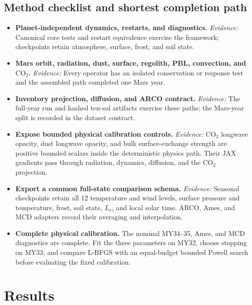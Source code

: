 \documentclass{article}
\newcommand{\done}{\(\boxtimes\)}
\newcommand{\todo}{\(\square\)}
\newcommand{\evidence}{\textit{Evidence:}}
\begin{document}
\subsection{Method checklist and shortest completion path}
\begin{itemize}[leftmargin=1.8em,itemsep=5pt]
\item[\done] \textbf{Planet-independent dynamics, restarts, and diagnostics.}
\evidence{} Canonical core tests and restart equivalence exercise the framework;
checkpoints retain atmosphere, surface, frost, and soil state.

\item[\done] \textbf{Mars orbit, radiation, dust, surface, regolith, PBL,
convection, and \(\mathrm{CO_2}\).} \evidence{} Every operator has an isolated
conservation or response test and the assembled path completed one Mars year.

\item[\done] \textbf{Inventory projection, diffusion, and ARCO contract.}
\evidence{} The full-year run and hashed ten-sol artifacts exercise these paths;
the Mars-year split is recorded in the dataset contract.

\item[\done] \textbf{Expose bounded physical calibration controls.}
\evidence{} CO$_2$ longwave opacity, dust longwave opacity, and bulk
surface-exchange strength are positive bounded scalars inside the deterministic
physics path. Their JAX gradients pass through radiation, dynamics, diffusion,
and the CO$_2$ projection.

\item[\done] \textbf{Export a common full-state comparison schema.}
\evidence{} Seasonal checkpoints retain all 12 temperature and wind levels,
surface pressure and temperature, frost, soil state, \(L_s\), and local solar
time. ARCO, Ames, and MCD adapters record their averaging and interpolation.

\item[\todo] \textbf{Complete physical calibration.}
The nominal MY34--35, Ames, and MCD diagnostics are complete. Fit the three
parameters on MY32, choose stopping on MY33, and compare L-BFGS with an
equal-budget bounded Powell search before evaluating the fixed calibration.
\end{itemize}

\section{Results}
\end{document}
